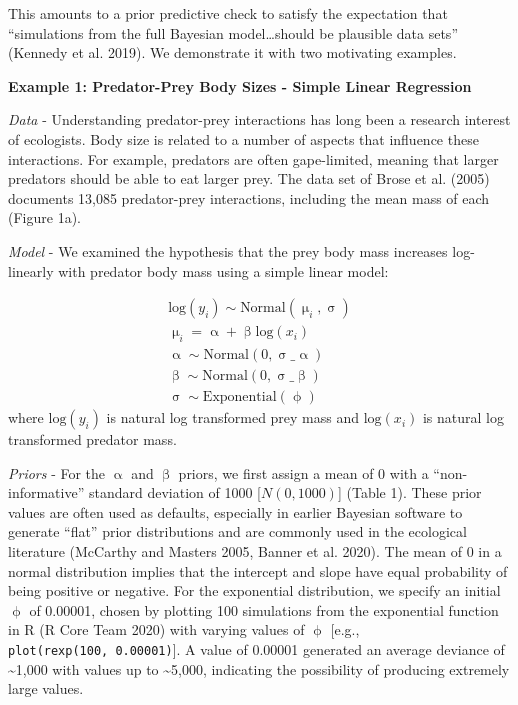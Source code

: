 \documentclass[
  12pt,
]{article}
\begin{document}
This amounts to a prior predictive check to satisfy the expectation that
``simulations from the full Bayesian model\ldots should be plausible
data sets'' (Kennedy et al. 2019). We demonstrate it with two motivating
examples.

\textbf{Example 1: Predator-Prey Body Sizes - Simple Linear Regression}

\emph{Data} - Understanding predator-prey interactions has long been a
research interest of ecologists. Body size is related to a number of
aspects that influence these interactions. For example, predators are
often gape-limited, meaning that larger predators should be able to eat
larger prey. The data set of Brose et al. (2005) documents 13,085
predator-prey interactions, including the mean mass of each (Figure 1a).

\emph{Model} - We examined the hypothesis that the prey body mass
increases log-linearly with predator body mass using a simple linear
model:

\begin{align} \text{log} (y_i) \sim \text{Normal}(\upmu_i, \upsigma)\\ \upmu_i = \upalpha + \upbeta \text{log}(x_i)\\ \upalpha \sim \text{Normal}(0, \upsigma\_{\upalpha})\\ \upbeta \sim \text{Normal}(0, \upsigma\_{\upbeta})\\ \upsigma \sim \text{Exponential}(\upphi) \end{align}
where \(\text{log}(y_i)\) is natural log transformed prey mass and
\(\text{log}(x_i)\) is natural log transformed predator mass.

\emph{Priors} - For the \(\upalpha\) and \(\upbeta\) priors, we first
assign a mean of 0 with a ``non-informative'' standard deviation of 1000
{[}\(N(0, 1000)\){]} (Table 1). These prior values are often used as
defaults, especially in earlier Bayesian software to generate ``flat''
prior distributions and are commonly used in the ecological literature
(McCarthy and Masters 2005, Banner et al. 2020). The mean of 0 in a
normal distribution implies that the intercept and slope have equal
probability of being positive or negative. For the exponential
distribution, we specify an initial \(\upphi\) of 0.00001, chosen by
plotting 100 simulations from the exponential function in R (R Core Team
2020) with varying values of \(\upphi\) {[}e.g.,
\texttt{plot(rexp(100,\ 0.00001)}{]}. A value of 0.00001 generated an
average deviance of \textasciitilde1,000 with values up to
\textasciitilde5,000, indicating the possibility of producing extremely
large values.
\end{document}

